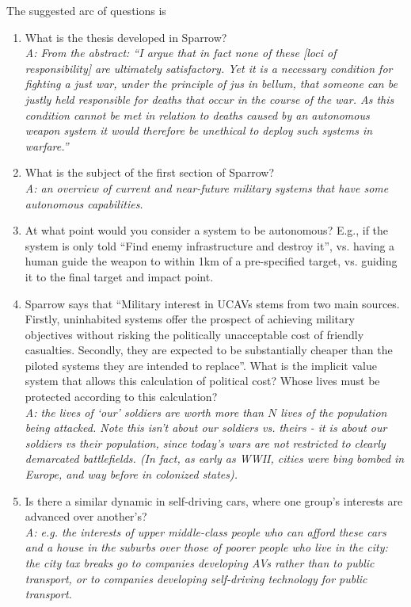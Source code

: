 \documentclass[letta4 paper]{article}
\numberwithin{equation}{section}
\newcommand{\0}{\mathbf{0}}
\begin{document}
	The suggested arc of questions is
	\begin{enumerate}
		\item What is the thesis developed in Sparrow?
		\\
		\textit{A: From the abstract: ``I
			argue that in fact none of these [loci of responsibility] are ultimately satisfactory. Yet it is a necessary condition for fighting a just war, under the principle of jus in bellum, that someone can be justly held responsible for deaths that occur in the course of the war. As this condition cannot be met in  relation to deaths caused by an autonomous weapon system it would therefore be unethical to
			deploy such systems in warfare.''}
		
		\item What is the subject of the first section of Sparrow? 
		\\
		\textit{A: an overview of current and near-future military systems that have some autonomous capabilities.}
		
		\item At what point would you consider a system to be autonomous? 
		E.g., if the system is only told ``Find enemy infrastructure and destroy it'', vs. having a human guide the weapon to within 1km of a pre-specified target, vs. guiding it to the final target and impact point.
		
		\item \label{RLQ:value} Sparrow says that ``Military interest in UCAVs stems from two main sources.
		Firstly, uninhabited systems offer the prospect of achieving military objectives without
		risking the politically unacceptable cost of friendly casualties. Secondly, they are expected
		to be substantially cheaper than the piloted systems they are intended to replace''. 
		What is the implicit value system that allows this calculation of political cost? Whose lives must  be protected according to this calculation? 
		\\
		\textit{A: the lives of `our' soldiers are worth more than $N$ lives of the population being attacked. Note this isn't about our soldiers vs. theirs - it is about our soldiers vs their population, since today's wars are not restricted to clearly demarcated battlefields. (In fact, as early as WWII, cities were bing bombed in Europe, and way before in colonized states).}
		
		\item Is there a similar dynamic in self-driving cars, where one group's interests are advanced over another's?
		\\
		\textit{A: e.g. the interests of upper middle-class people who can afford these cars and a house in the suburbs over those of poorer people who live in the city: the city tax breaks go to companies developing AVs rather than to public transport, or to companies developing self-driving technology for public transport.}
		

\end{enumerate}
\end{document}

